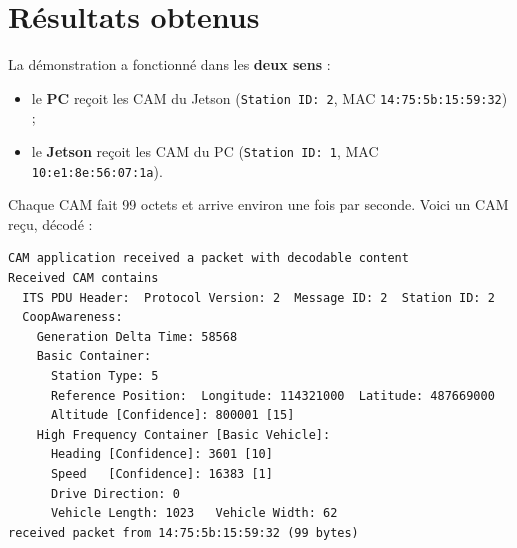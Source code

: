 \documentclass[a4paper,11pt]{article}
\newcommand{\code}[1]{\texttt{#1}}
\begin{document}
\section{Résultats obtenus}
La démonstration a fonctionné dans les \textbf{deux sens} :
\begin{itemize}[leftmargin=1.6em]
  \item le \textbf{PC} reçoit les CAM du Jetson (\code{Station ID: 2},
        MAC \code{14:75:5b:15:59:32}) ;
  \item le \textbf{Jetson} reçoit les CAM du PC (\code{Station ID: 1},
        MAC \code{10:e1:8e:56:07:1a}).
\end{itemize}
Chaque CAM fait 99 octets et arrive environ une fois par seconde. Voici un CAM reçu,
décodé :

\begin{lstlisting}
CAM application received a packet with decodable content
Received CAM contains
  ITS PDU Header:  Protocol Version: 2  Message ID: 2  Station ID: 2
  CoopAwareness:
    Generation Delta Time: 58568
    Basic Container:
      Station Type: 5
      Reference Position:  Longitude: 114321000  Latitude: 487669000
      Altitude [Confidence]: 800001 [15]
    High Frequency Container [Basic Vehicle]:
      Heading [Confidence]: 3601 [10]
      Speed   [Confidence]: 16383 [1]
      Drive Direction: 0
      Vehicle Length: 1023   Vehicle Width: 62
received packet from 14:75:5b:15:59:32 (99 bytes)
\end{lstlisting}
\end{document}
